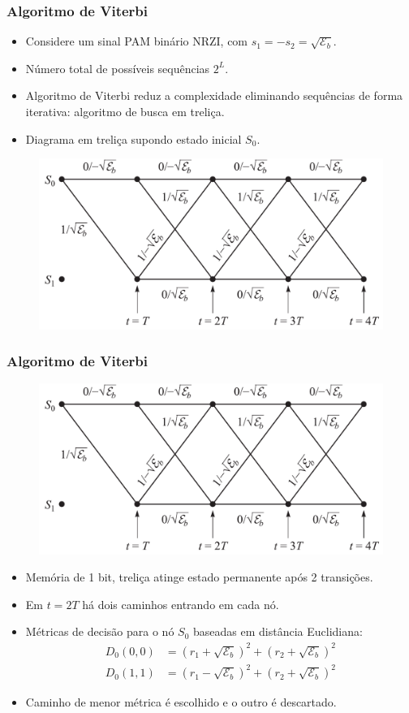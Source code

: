 \begin{frame}
	\frametitle{Algoritmo de Viterbi}

	\begin{itemize}
	    \item Considere um sinal PAM binário NRZI, com $s_1 = -s_2 = \sqrt{\mathcal{E}_b}$.
	    \item Número total de possíveis sequências $2^L$.
	    \item Algoritmo de Viterbi reduz a complexidade eliminando sequências de forma iterativa: algoritmo de busca em treliça.
	    \item Diagrama em treliça supondo estado inicial $S_0$.	    
	\end{itemize}
	\begin{figure}[t]	
	  \begin{center}
	    \includegraphics[width=0.5\columnwidth]{figs/pam_38}
	  \end{center}
	\end{figure}
\end{frame}

\begin{frame}
	\frametitle{Algoritmo de Viterbi}

	\vspace{-0.3cm}
	\begin{figure}[t]	
	  \begin{center}
	    \includegraphics[width=0.5\columnwidth]{figs/pam_38}
	  \end{center}\vspace{-0.5cm}
	\end{figure}
	\begin{itemize}
	    \item Memória de 1 bit, treliça atinge estado permanente após 2 transições.
	    \item Em $t=2T$ há dois caminhos entrando em cada nó.
	    \item Métricas de decisão para o nó $S_0$ baseadas em distância Euclidiana:
	    \begin{align*}
		D_0(0,0) &= (r_1 + \sqrt{\mathcal{E}_b})^2 + (r_2 + \sqrt{\mathcal{E}_b})^2 \\
		D_0(1,1) &= (r_1 - \sqrt{\mathcal{E}_b})^2 + (r_2 + \sqrt{\mathcal{E}_b})^2
	    \end{align*}
	    \item Caminho de menor métrica é escolhido e o outro é descartado.
	\end{itemize}
\end{frame}


